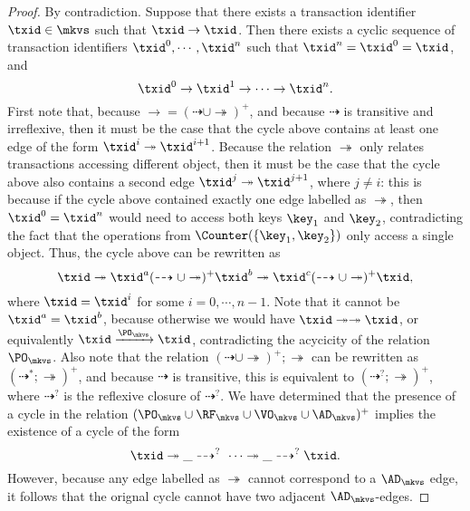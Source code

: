 \begin{proof}
By contradiction. Suppose that there exists a transaction identifier $\txid \in \mkvs$ such that 
$\txid \rightarrow \txid$. Then there exists a cyclic sequence of transaction identifiers 
$\txid^{0}, \cdots, \txid^{n}$ such that $\txid^{n} =  \txid^{0} = \txid$, and
\[ 
\txid^{0} \rightarrow \txid^{1} \rightarrow \cdots \rightarrow \txid^{n}.
\]
First note that, because $\rightarrow = (\dashrightarrow \cup \twoheadrightarrow)^{+}$, 
and because $\dashrightarrow$ is transitive and irreflexive, then it must be the 
case that the cycle above contains at least one edge of the form $\txid^{i} \twoheadrightarrow \txid^{i+1}$. 
Because the relation $\twoheadrightarrow$ only relates transactions accessing different object, 
then it must be the case that the cycle above also contains a second edge $\txid^{j} \twoheadrightarrow \txid^{j+1}$, 
where $j \neq i$: this is because if the cycle above contained exactly one edge labelled as $\twoheadrightarrow$, 
then $\txid^{0} = \txid^{n}$ would need to access both keys $\key_1$ and $\key_2$, contradicting the 
fact that the operations from $\Counter(\{\key_1, \key_2\})$ only access a single object. 
Thus, the cycle above can be rewritten as 
\[ 
\txid \twoheadrightarrow \txid^{a} (\dashrightarrow \cup \twoheadrightarrow)^{+} \txid^{b} \twoheadrightarrow  \txid^{c} (\dashrightarrow \cup \twoheadrightarrow)^{+} \txid, 
\]
where $\txid = \txid^{i}$ for some $i=0,\cdots, n-1$. Note that it cannot be $\txid^{a} = \txid^{b}$, because 
otherwise we would have $\txid \twoheadrightarrow \twoheadrightarrow \txid$, or equivalently 
$\txid \xrightarrow{\PO_{\mkvs}} \txid$, contradicting the acycicity of the relation $\PO_{\mkvs}$. 
Also note that the relation $(\dashrightarrow \cup \twoheadrightarrow)^{+} ; \twoheadrightarrow$ can be rewritten as 
$(\dashrightarrow^{*} ; \twoheadrightarrow)^{+}$, and because $\dashrightarrow$ is transitive, 
this is equivalent to $(\dashrightarrow^{?} ; \twoheadrightarrow)^{+}$, where $\dashrightarrow^{?}$ is 
the reflexive closure of $\dashrightarrow^{?}$. 
We have determined that the presence of a cycle in the relation $(\PO_{\mkvs} \cup \RF_{\mkvs} \cup \VO_{\mkvs} \cup \AD_{\mkvs})^{+}$ 
implies the existence of a cycle of the form 
\[
\txid \twoheadrightarrow \_ \dashrightarrow^{?} \ \cdots \twoheadrightarrow \_ \dashrightarrow^{?} \txid.
\]
However, because any edge labelled as $\twoheadrightarrow$ cannot correspond to a $\AD_{\mkvs}$ edge, 
it follows that the orignal cycle cannot have two adjacent $\AD_{\mkvs}$-edges. 
%

\end{proof}
